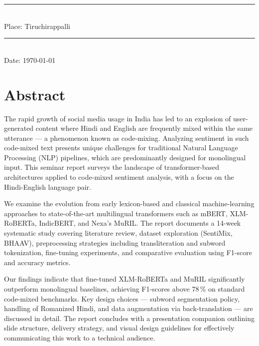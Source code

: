 \documentclass[12pt,a4paper]{report}
\begin{document}
\noindent
\begin{minipage}[t]{0.48\textwidth}
  \centering
  \rule{0.7\textwidth}{0.4pt}\\[4pt]
  {\small\color{graytext} Place: Tiruchirappalli}
\end{minipage}
\hfill
\begin{minipage}[t]{0.48\textwidth}
  \centering
  \rule{0.7\textwidth}{0.4pt}\\[4pt]
  {\small\color{graytext} Date: \today}
\end{minipage}

\clearpage

\chapter*{Abstract}

The rapid growth of social media usage in India has led to an explosion of user-generated content where Hindi and English are frequently mixed within the same utterance — a phenomenon known as code-mixing. Analyzing sentiment in such code-mixed text presents unique challenges for traditional Natural Language Processing (NLP) pipelines, which are predominantly designed for monolingual input. This seminar report surveys the landscape of transformer-based architectures applied to code-mixed sentiment analysis, with a focus on the Hindi-English language pair.

We examine the evolution from early lexicon-based and classical machine-learning approaches to state-of-the-art multilingual transformers such as mBERT, XLM-RoBERTa, IndicBERT, and Nexa's MuRIL. The report documents a 14-week systematic study covering literature review, dataset exploration (SentiMix, BHAAV), preprocessing strategies including transliteration and subword tokenization, fine-tuning experiments, and comparative evaluation using F1-score and accuracy metrics.

Our findings indicate that fine-tuned XLM-RoBERTa and MuRIL significantly outperform monolingual baselines, achieving F1-scores above 78\,\% on standard code-mixed benchmarks. Key design choices — subword segmentation policy, handling of Romanized Hindi, and data augmentation via back-translation — are discussed in detail. The report concludes with a presentation companion outlining slide structure, delivery strategy, and visual design guidelines for effectively communicating this work to a technical audience.
\end{document}
